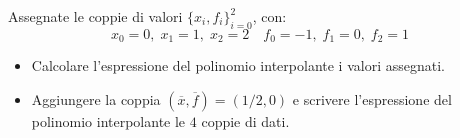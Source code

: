 Assegnate le coppie di valori $\{x_i,f_i \}_{i=0}^2$, con:
\[
x_0=0, \; x_1=1, \; x_2=2 \quad f_0=-1, \; f_1=0, \; f_2=1
\]
\begin{itemize}
\item  Calcolare l'espressione del polinomio interpolante i
valori assegnati.
\item
Aggiungere la coppia $(\overline{x},\overline{f})=(1/2,0)$ e
scrivere l'espressione del polinomio interpolante le $4$ coppie
di dati.

\end{itemize}
